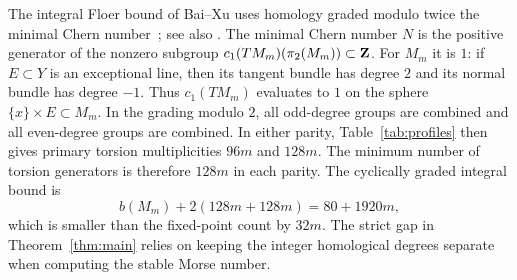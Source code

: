 \begin{remark}\label{counts:integral-Floer-bound}
The integral Floer bound of Bai--Xu uses homology graded modulo twice the
minimal Chern number~\cite[Theorem~A]{BaiXu2022}; see also
\cite[Corollary~1.2]{BaiXu2026}. The minimal Chern number $N$ is the positive generator of
the nonzero subgroup $c_1(TM_m)(\pi_2(M_m))\subset\mathbf Z$.
For $M_m$ it is $1$: if $E\subset Y$ is an exceptional line, then its
tangent bundle has degree $2$ and its normal bundle has degree $-1$.
Thus $c_1(TM_m)$ evaluates to $1$ on the sphere $\{x\}\times E\subset M_m$.
In the grading modulo $2$, all odd-degree groups are combined and all
even-degree groups are combined. In either parity, Table~\ref{tab:profiles}
then gives primary torsion multiplicities $96m$ and $128m$. The minimum
number of torsion generators is therefore $128m$ in each parity. The
cyclically graded integral bound is
\[
 b(M_m)+2(128m+128m)=80+1920m,
\]
which is smaller than the fixed-point count by $32m$. The strict gap in
Theorem~\ref{thm:main} relies on keeping the integer homological degrees
separate when computing the stable Morse number.
\end{remark}
